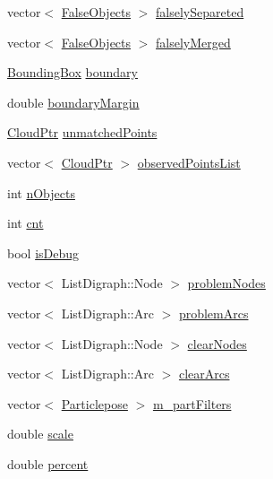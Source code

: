 \begin{DoxyCompactItemize}
\item 
vector$<$ \hyperlink{struct_false_objects}{\-False\-Objects} $>$ \hyperlink{class_p_c_tracking_a8ee53b44e5c3f9dfd4b33f6719487fa4}{falsely\-Separeted}
\item 
vector$<$ \hyperlink{struct_false_objects}{\-False\-Objects} $>$ \hyperlink{class_p_c_tracking_a54d6b67b92c09bc50250c108752c5401}{falsely\-Merged}
\item 
\hyperlink{struct_bounding_box}{\-Bounding\-Box} \hyperlink{class_p_c_tracking_a3cbc2f6326c28bc2d136dcb53dac1a5f}{boundary}
\item 
double \hyperlink{class_p_c_tracking_a9450eac64c156b259c0c2426b0344f75}{boundary\-Margin}
\item 
\hyperlink{common_8h_a36884aa4a3c181fa4c284d79329ad166}{\-Cloud\-Ptr} \hyperlink{class_p_c_tracking_ade7cb8fd4d872bb9eda66ae2f1a264be}{unmatched\-Points}
\item 
vector$<$ \hyperlink{common_8h_a36884aa4a3c181fa4c284d79329ad166}{\-Cloud\-Ptr} $>$ \hyperlink{class_p_c_tracking_a64744d8b04a156e22dea3f5eae0fbe66}{observed\-Points\-List}
\item 
int \hyperlink{class_p_c_tracking_a7ad3bddfa579851a0c7d34664b2adf0f}{n\-Objects}
\item 
int \hyperlink{class_p_c_tracking_aa642907555b7fad809a938b70bd06d8e}{cnt}
\item 
bool \hyperlink{class_p_c_tracking_a9f0e2ba11bbca068561a58836decca07}{is\-Debug}
\item 
vector$<$ \-List\-Digraph\-::\-Node $>$ \hyperlink{class_p_c_tracking_aab4c50eb3b2f683084a01a32b279f07e}{problem\-Nodes}
\item 
vector$<$ \-List\-Digraph\-::\-Arc $>$ \hyperlink{class_p_c_tracking_a8a1d5993a52b155b865f01ce25d89347}{problem\-Arcs}
\item 
vector$<$ \-List\-Digraph\-::\-Node $>$ \hyperlink{class_p_c_tracking_a1d232ae428087d499e6696dfa17ed285}{clear\-Nodes}
\item 
vector$<$ \-List\-Digraph\-::\-Arc $>$ \hyperlink{class_p_c_tracking_aa7ecd7598977c022ffabbb7e74c80d28}{clear\-Arcs}
\item 
vector$<$ \hyperlink{class_particlepose}{\-Particlepose} $>$ \hyperlink{class_p_c_tracking_a8347f3c784c2b3fafc59581dc9aa58fa}{m\-\_\-part\-Filters}
\item 
double \hyperlink{class_p_c_tracking_ad1866b9f30cecda195efdadabbe75bec}{scale}
\item 
double \hyperlink{class_p_c_tracking_a5db04fafbd2c9a5e94ea8806440c630e}{percent}

\end{DoxyCompactItemize}
